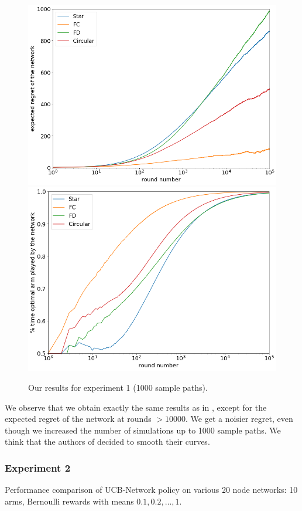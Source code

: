 \documentclass{article}
\begin{document}
\begin{figure}[H]
  \centering
  \includegraphics[width=0.49\linewidth]{fig1_1_ours.png}
  \includegraphics[width=0.49\linewidth]{fig1_2_ours.png}
  \caption{Our results for experiment 1 (1000 sample paths).}
\end{figure}

We observe that we obtain exactly the same results as in \cite{DBLP:journals/corr/KollaJG16}, except for the expected regret of the network at rounds $ > 10000$. We get a noisier regret, even though we increased the number of simulations up to 1000 sample paths. We think that the authors of \cite{DBLP:journals/corr/KollaJG16} decided to smooth their curves.

\subsubsection{Experiment 2}

Performance comparison of UCB-Network policy on various 20 node networks: 10 arms, Bernoulli rewards with means $0.1, 0.2, \dots, 1$.
\end{document}
